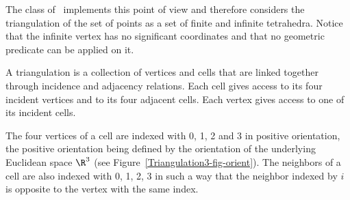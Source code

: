 The class  of \cgal\ implements this
point of view and therefore considers the triangulation of the set
of points as a set of finite and infinite tetrahedra.  Notice that the
infinite vertex has no significant coordinates and that no
geometric predicate can be applied on it.

A triangulation is a collection of vertices and cells that are linked
together through incidence and adjacency relations. Each cell gives
access to its four incident vertices and to its four adjacent
cells. Each vertex gives access to one of its incident cells.

The four vertices of a cell are indexed with 0, 1, 2 and 3 in positive
orientation, the positive orientation being defined by the orientation
of the underlying Euclidean space $\R^3$ (see
Figure~\ref{Triangulation3-fig-orient}). The neighbors of a cell are also
indexed with 0, 1, 2, 3 in such a way that the neighbor indexed by $i$
is opposite to the vertex with the same index. 

